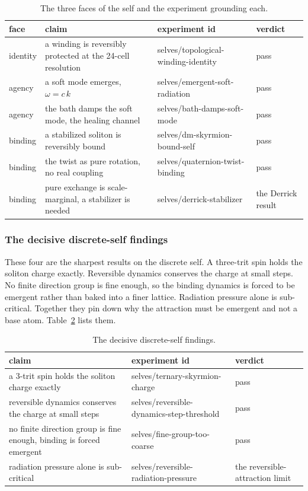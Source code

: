 \begin{table}[ht]
\centering
\begin{tabular}{@{}p{}p{}p{}p{}@{}}
\toprule
face & claim & experiment id & verdict \\
\midrule
identity & a winding is reversibly protected at the 24-cell resolution & selves/topological-winding-identity & pass \\
agency & a soft mode emerges, $\omega = c\,k$ & selves/emergent-soft-radiation & pass \\
agency & the bath damps the soft mode, the healing channel & selves/bath-damps-soft-mode & pass \\
binding & a stabilized soliton is reversibly bound & selves/dm-skyrmion-bound-self & pass \\
binding & the twist as pure rotation, no real coupling & selves/quaternion-twist-binding & pass \\
binding & pure exchange is scale-marginal, a stabilizer is needed & selves/derrick-stabilizer & the Derrick result \\
\bottomrule
\end{tabular}
\caption{The three faces of the self and the experiment grounding each.}
\label{tab:three-faces}
\end{table}

\subsubsection{The decisive discrete-self findings}

These four are the sharpest results on the discrete self. A three-trit spin holds the soliton charge exactly. Reversible dynamics conserves the charge at small steps. No finite direction group is fine enough, so the binding dynamics is forced to be emergent rather than baked into a finer lattice. Radiation pressure alone is sub-critical. Together they pin down why the attraction must be emergent and not a base atom. Table~\ref{tab:discrete} lists them.

\begin{table}[ht]
\centering
\begin{tabular}{@{}p{}p{}p{}@{}}
\toprule
claim & experiment id & verdict \\
\midrule
a 3-trit spin holds the soliton charge exactly & selves/ternary-skyrmion-charge & pass \\
reversible dynamics conserves the charge at small steps & selves/reversible-dynamics-step-threshold & pass \\
no finite direction group is fine enough, binding is forced emergent & selves/fine-group-too-coarse & pass \\
radiation pressure alone is sub-critical & selves/reversible-radiation-pressure & the reversible-attraction limit \\
\bottomrule
\end{tabular}
\caption{The decisive discrete-self findings.}
\label{tab:discrete}
\end{table}

